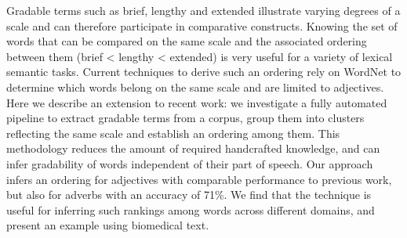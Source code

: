 Gradable terms such as brief, lengthy and extended illustrate varying degrees of a scale and can therefore participate in comparative constructs. Knowing the set of words that can be compared on the same scale and the associated ordering between them (brief < lengthy < extended) is very useful for a variety of lexical semantic tasks. Current techniques to derive such an ordering rely on WordNet to determine which words belong on the same scale and are limited to adjectives. Here we describe an extension to recent work: we investigate a fully automated pipeline to extract gradable terms from a corpus, group them into clusters reflecting the same scale and establish an ordering among them. This methodology reduces the amount of required handcrafted knowledge, and can infer gradability of words independent of their part of speech. Our approach infers an ordering for adjectives with comparable performance to previous work, but also for adverbs with an accuracy of 71\%. We find that the technique is useful for inferring such rankings among words across different domains, and present an example using biomedical text.
